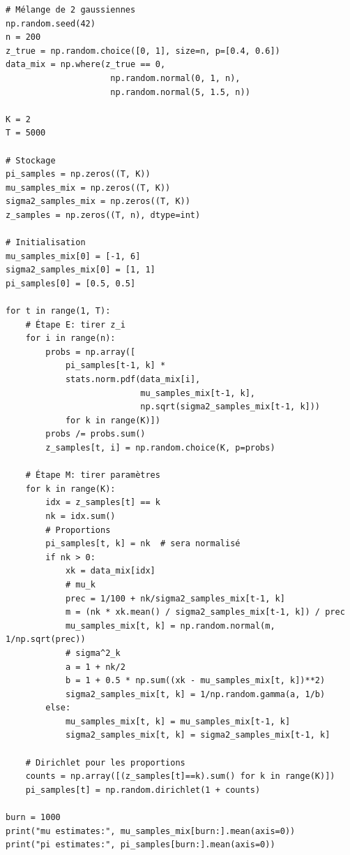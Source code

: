 \begin{codeblock}[title=\textbf{Gibbs pour m\'elange de gaussiennes}]
\begin{verbatim}
# Mélange de 2 gaussiennes
np.random.seed(42)
n = 200
z_true = np.random.choice([0, 1], size=n, p=[0.4, 0.6])
data_mix = np.where(z_true == 0,
                     np.random.normal(0, 1, n),
                     np.random.normal(5, 1.5, n))

K = 2
T = 5000

# Stockage
pi_samples = np.zeros((T, K))
mu_samples_mix = np.zeros((T, K))
sigma2_samples_mix = np.zeros((T, K))
z_samples = np.zeros((T, n), dtype=int)

# Initialisation
mu_samples_mix[0] = [-1, 6]
sigma2_samples_mix[0] = [1, 1]
pi_samples[0] = [0.5, 0.5]

for t in range(1, T):
    # Étape E: tirer z_i
    for i in range(n):
        probs = np.array([
            pi_samples[t-1, k] *
            stats.norm.pdf(data_mix[i],
                           mu_samples_mix[t-1, k],
                           np.sqrt(sigma2_samples_mix[t-1, k]))
            for k in range(K)])
        probs /= probs.sum()
        z_samples[t, i] = np.random.choice(K, p=probs)

    # Étape M: tirer paramètres
    for k in range(K):
        idx = z_samples[t] == k
        nk = idx.sum()
        # Proportions
        pi_samples[t, k] = nk  # sera normalisé
        if nk > 0:
            xk = data_mix[idx]
            # mu_k
            prec = 1/100 + nk/sigma2_samples_mix[t-1, k]
            m = (nk * xk.mean() / sigma2_samples_mix[t-1, k]) / prec
            mu_samples_mix[t, k] = np.random.normal(m, 1/np.sqrt(prec))
            # sigma^2_k
            a = 1 + nk/2
            b = 1 + 0.5 * np.sum((xk - mu_samples_mix[t, k])**2)
            sigma2_samples_mix[t, k] = 1/np.random.gamma(a, 1/b)
        else:
            mu_samples_mix[t, k] = mu_samples_mix[t-1, k]
            sigma2_samples_mix[t, k] = sigma2_samples_mix[t-1, k]

    # Dirichlet pour les proportions
    counts = np.array([(z_samples[t]==k).sum() for k in range(K)])
    pi_samples[t] = np.random.dirichlet(1 + counts)

burn = 1000
print("mu estimates:", mu_samples_mix[burn:].mean(axis=0))
print("pi estimates:", pi_samples[burn:].mean(axis=0))
\end{verbatim}
\end{codeblock}

